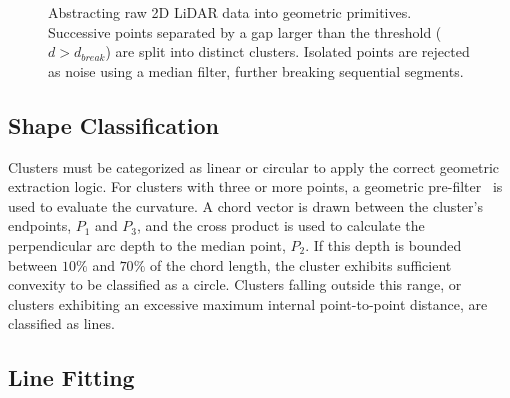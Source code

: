 \begin{figure}[htpb]
    \caption{Abstracting raw 2D LiDAR data into geometric primitives. Successive points separated by a gap larger than the threshold ($d > d_{break}$) are split into distinct clusters. Isolated points are rejected as noise using a median filter, further breaking sequential segments.}
    \label{fig:clustering}
\end{figure}

\subsection{Shape Classification}
\label{subsec:tb-shape-classification}

Clusters must be categorized as linear or circular to apply the correct geometric extraction logic. For clusters with three or more points, a geometric pre-filter~\cite{xavier2005circledetection} is used to evaluate the curvature. A chord vector is drawn between the cluster's endpoints, $P_1$ and $P_3$, and the cross product is used to calculate the perpendicular arc depth to the median point, $P_2$. If this depth is bounded between $10\%$ and $70\%$ of the chord length, the cluster exhibits sufficient convexity to be classified as a circle. Clusters falling outside this range, or clusters exhibiting an excessive maximum internal point-to-point distance, are classified as lines.

\subsection{Line Fitting}
\label{subsec:line-fitting}

